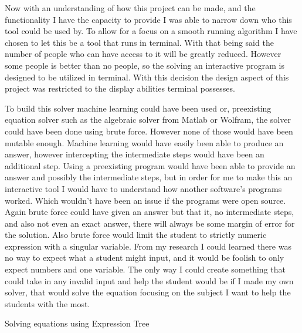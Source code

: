 \documentclass[10pt,twocolumn]{article}
\begin{document}
 Now with an understanding of how this project can be made, and the functionality I have the capacity to provide I was able to narrow down who this tool could be used by. To allow for a focus on a smooth running algorithm I have chosen to let this be a tool that runs in terminal. With that being said the number of people who can have access to it will be greatly reduced. However some people is better than no people, so the solving an interactive program is designed to be utilized in terminal. With this decision the design aspect of this project was restricted to the display abilities terminal possesses.
 
To build this solver machine learning could have been used or, preexisting equation solver such as the algebraic solver from Matlab or Wolfram, the solver could have been done using brute force. However none of those would have been mutable enough. Machine learning would have easily been able to produce an answer, however intercepting the intermediate steps would have been an additional step. Using a preexisting program would have been able to provide an answer and possibly the intermediate steps, but in order for me to make this an interactive tool I would have to understand how another software's programs worked. Which wouldn't have been an issue if the programs were open source. Again brute force could have given an answer but that it, no intermediate steps, and also not even an exact answer, there will always be some margin of error for the solution. Also brute force would limit the student to strictly numeric expression with a singular variable. From my research I could learned there was no way to expect what a student might input, and it would be foolish to only expect numbers and one variable. The only way I could create something that could take in any invalid input and help the student would be if I made my own solver, that would solve the equation focusing on the subject I want to help the students with the most. 

\begin{algorithm}[H]
 \caption{Solving equations using Expression Tree}
\end{algorithm}
\end{document}
